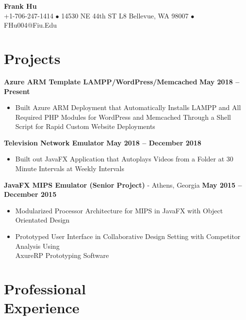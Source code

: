 \documentclass[margin,line]{resume}
\begin{document}
	{\centering \LARGE{\textbf{Frank Hu}}}
	\\
	\normalsize
	+1-706-247-1414 $\bullet$ 14530 NE 44th ST L8 Bellevue, WA 98007 $\bullet$ FHu004@Fiu.Edu
	
	\begin{resume}	
		
	
	\section{\mysidestyle Projects}
	
	\textbf{Azure ARM Template LAMPP/WordPress/Memcached}  \hfill \textbf{May 2018 -- Present}
	\vspace{1mm}
	\begin{itemize}
		\item Built Azure ARM Deployment that Automatically Installs LAMPP and All Required PHP Modules for WordPress and Memcached Through a Shell Script for Rapid Custom Website Deployments
	\end{itemize}
	
	\textbf{Television Network Emulator}  \hfill \textbf{May 2018 -- December 2018}
	\vspace{1mm}
	\begin{itemize}
		\item Built out JavaFX Application that Autoplays Videos from a Folder at 30 Minute Intervals at Weekly Intervals
	\end{itemize}
	
	\textbf{JavaFX MIPS Emulator (Senior Project)} - Athens, Georgia \vspace{1mm} \hfill \textbf{May 2015 -- December 2015}
	\begin{itemize} 
		\item Modularized Processor Architecture for MIPS in JavaFX with Object Orientated Design
		\item Prototyped User Interface in Collaborative Design Setting with Competitor Analysis Using \\
		AxureRP Prototyping Software  
	\end{itemize}
	
		
		
	\section{\mysidestyle Professional\\Experience}
	

\end{resume}
\end{document}
